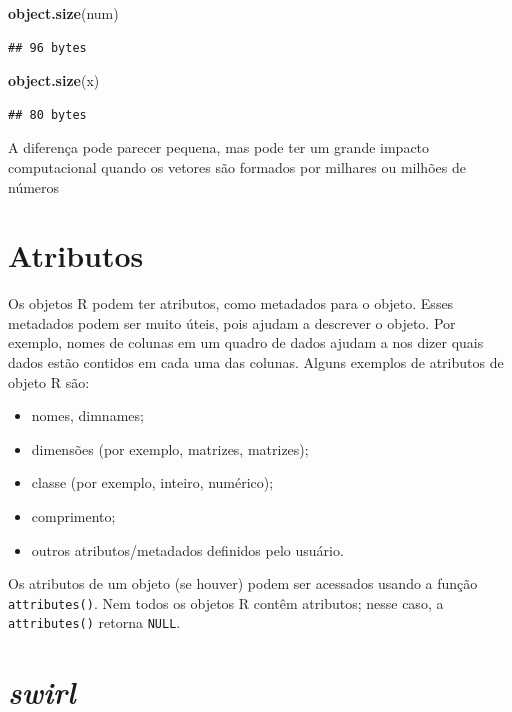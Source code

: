 \documentclass[a4paper]{book}
\newenvironment{Shaded}{\begin{snugshade}}{\end{snugshade}}
\newcommand{\KeywordTok}[1]{\textcolor[rgb]{0.13,0.29,0.53}{\textbf{#1}}}
\newcommand{\NormalTok}[1]{#1}
\begin{document}
\begin{Shaded}
\begin{Highlighting}[]
\KeywordTok{object.size}\NormalTok{(num)}
\end{Highlighting}
\end{Shaded}

\begin{verbatim}
## 96 bytes
\end{verbatim}

\begin{Shaded}
\begin{Highlighting}[]
\KeywordTok{object.size}\NormalTok{(x)}
\end{Highlighting}
\end{Shaded}

\begin{verbatim}
## 80 bytes
\end{verbatim}

A diferença pode parecer pequena, mas pode ter um grande impacto computacional quando os vetores são formados por milhares ou milhões de números

\hypertarget{atributos}{%
\section{Atributos}\label{atributos}}

Os objetos R podem ter atributos, como metadados para o objeto. Esses metadados podem ser muito úteis, pois ajudam a descrever o objeto. Por exemplo, nomes de colunas em um quadro de dados ajudam a nos dizer quais dados estão contidos em cada uma das colunas. Alguns exemplos de atributos de objeto R são:

\begin{itemize}
\item
  nomes, dimnames;
\item
  dimensões (por exemplo, matrizes, matrizes);
\item
  classe (por exemplo, inteiro, numérico);
\item
  comprimento;
\item
  outros atributos/metadados definidos pelo usuário.
\end{itemize}

Os atributos de um objeto (se houver) podem ser acessados usando a função \texttt{attributes()}. Nem todos os objetos R contêm atributos; nesse caso, a \texttt{attributes()} retorna \texttt{NULL}.

\hypertarget{swirl}{%
\section{\texorpdfstring{\emph{swirl}}{swirl}}\label{swirl}}
\end{document}
